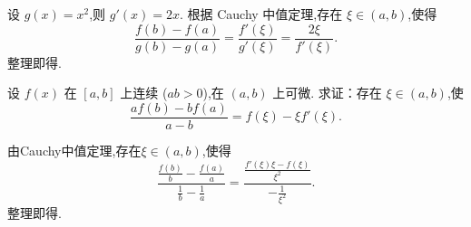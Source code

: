 \begin{solution}
    设 $g(x) = x^2$,则 $g'(x) = 2x$. 根据 Cauchy 中值定理,存在 $\xi \in (a, b)$,使得
    $$
        \frac{f(b) - f(a)}{g(b) - g(a)} = \frac{f'(\xi)}{g'(\xi)} = \frac{2\xi}{f'(\xi)}.
    $$
    整理即得.
\end{solution}

\begin{exercise}[3.4.4]
    设 $f(x)$ 在 $[a, b]$ 上连续 ($ab > 0$),在 $(a, b)$ 上可微. 求证：存在 $\xi \in (a, b)$,使
    $$\frac{a f(b) - b f(a)}{a - b} = f(\xi) - \xi f'(\xi).$$
\end{exercise}

\begin{solution}
    由Cauchy中值定理,存在$\xi \in (a, b)$,使得
    $$\frac{ \frac{f(b)}{b} - \frac{f(a)}{a} }{ \frac{1}{b} - \frac{1}{a} } = \frac{\frac{f'(\xi)\xi - f(\xi)}{\xi^2}}{-\frac{1}{\xi^2}}.$$
    整理即得.
\end{solution}

